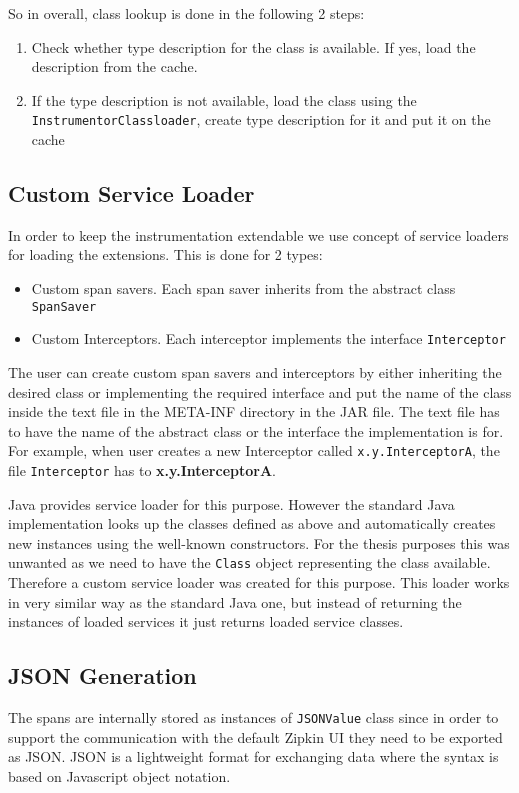 So in overall, class lookup is done in the following 2 steps:
\begin{enumerate}
	\item Check whether type description for the class is available. If yes, load the description from the cache.
	\item If the type description is not available, load the class using the \newline \texttt{InstrumentorClassloader}, create type description for it and put it on the cache
\end{enumerate}

\subsection{Custom Service Loader}
In order to keep the instrumentation extendable we use concept of service loaders for loading the extensions. This is done for 2 types:
\begin{itemize}
	\item Custom span savers. Each span saver inherits from the abstract class \texttt{SpanSaver}
	\item Custom Interceptors. Each interceptor implements the interface \texttt{Interceptor}
\end{itemize} 
The user can create custom span savers and interceptors by either inheriting the desired class or implementing the required interface and put the name of the class inside the text file in the META-INF directory in the JAR file. The text file has to have the name of the abstract class or the interface the implementation is for. For example, when user creates a new Interceptor called \texttt{x.y.InterceptorA}, the file \texttt{Interceptor} has to \textbf{x.y.InterceptorA}.

Java provides service loader for this purpose. However the standard Java implementation looks up the classes defined as above and automatically creates new instances using the well-known constructors. For the thesis purposes this was unwanted as we need to have the \texttt{Class} object representing the class available. Therefore a custom service loader was created for this purpose. This loader works in very similar way as the standard Java one, but instead of returning the instances of loaded services it just returns loaded service classes. 
\subsection{JSON Generation}
The spans are internally stored as instances of \texttt{JSONValue} class since in order to support the communication with the default Zipkin UI they need to be exported as JSON. JSON is a lightweight format for exchanging data where the syntax is based on Javascript object notation.

